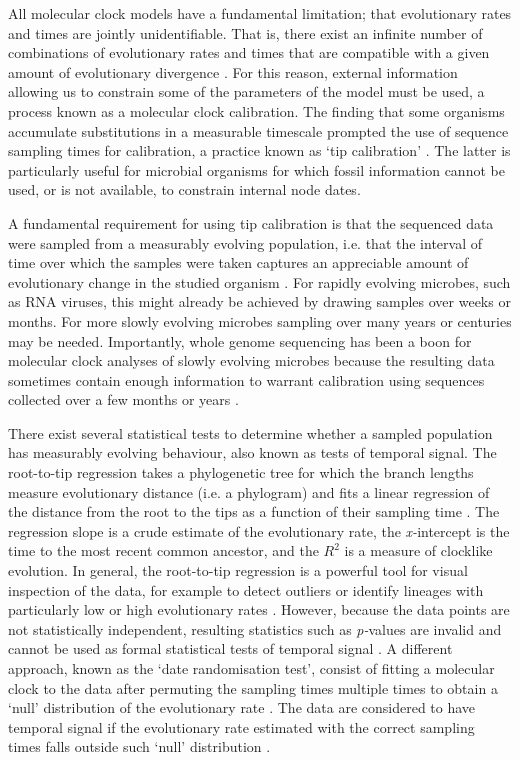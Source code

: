 \documentclass[10pt,letterpaper]{article}
\begin{document}
All molecular clock models have a fundamental limitation; that evolutionary rates and times are jointly unidentifiable. That is, there exist an infinite number of combinations of evolutionary rates and times that are compatible with a given amount of evolutionary divergence \cite{yang2006bayesian,dos2013unbearable}. For this reason, external information allowing us to constrain some of the parameters of the model must be used, a process known as a molecular clock calibration. The finding that some organisms accumulate substitutions in a measurable timescale prompted the use of sequence sampling times for calibration, a practice known as `tip calibration' \cite{rodrigo1999coalescent, korber2000timing}. The latter is particularly useful for microbial organisms for which fossil information cannot be used, or is not available, to constrain internal node dates. 

A fundamental requirement for using tip calibration is that the sequenced data were sampled from a measurably evolving population, i.e. that the interval of time over which the samples were taken captures an appreciable amount of evolutionary change in the studied organism \cite{drummond2003measurably}. For rapidly evolving microbes, such as RNA viruses, this might already be achieved by drawing samples over weeks or months. For more slowly evolving microbes sampling over many years or centuries may be needed. Importantly, whole genome sequencing has been a boon for molecular clock analyses of slowly evolving microbes because the resulting data sometimes contain enough information to warrant calibration using sequences collected over a few months or years \cite{biek2015measurably}.

There exist several statistical tests to determine whether a sampled population has measurably evolving behaviour, also known as tests of temporal signal. The root-to-tip regression takes a phylogenetic tree for which the branch lengths measure evolutionary distance (i.e. a phylogram) and fits a linear regression of the distance from the root to the tips as a function of their sampling time \cite{korber2000timing}. The regression slope is a crude estimate of the evolutionary rate, the \textit{x-}intercept is the time to the most recent common ancestor, and the $R^2$ is a measure of clocklike evolution. In general, the root-to-tip regression is a powerful tool for visual inspection of the data, for example to detect outliers or identify lineages with particularly low or high evolutionary rates \cite{rambaut2016exploring,featherstone2023clockor2,volz2017scalable, doizy2023phylostems}. However, because the data points are not statistically independent, resulting statistics such as \textit{p-}values are invalid and cannot be used as formal statistical tests of temporal signal \cite{rieux2016inferences}. A different approach, known as the `date randomisation test', consist of fitting a molecular clock to the data after permuting the sampling times multiple times to obtain a `null' distribution of the evolutionary rate \cite{ramsden2009hantavirus}. The data are considered to have temporal signal if the evolutionary rate estimated with the correct sampling times falls outside such `null' distribution \cite{ramsden2009hantavirus,duchene2015performance, murray2016effect}.
\end{document}
